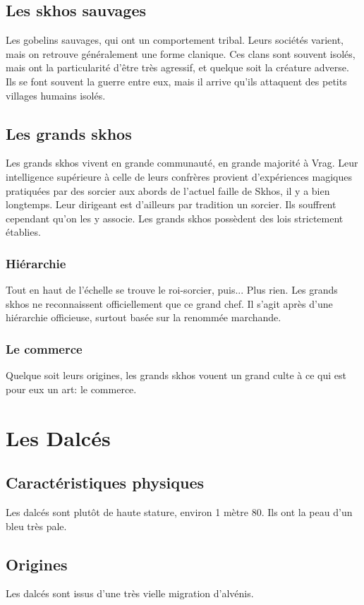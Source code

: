 \subsection{Les skhos sauvages}
Les gobelins sauvages, qui ont un comportement tribal. Leurs sociétés varient, mais on retrouve généralement une forme clanique. Ces clans sont souvent isolés, mais ont la particularité d'être très agressif, et quelque soit la créature adverse. Ils se font souvent la guerre entre eux, mais il arrive qu'ils attaquent des petits villages humains isolés.
\subsection{Les grands skhos}
Les grands skhos vivent en grande communauté, en grande majorité à Vrag. Leur intelligence supérieure à celle de leurs confrères provient d'expériences magiques pratiquées par des sorcier aux abords de l'actuel faille de Skhos, il y a bien longtemps. Leur dirigeant est d'ailleurs par tradition un sorcier.
Ils souffrent cependant qu’on les y associe. Les grands skhos possèdent des lois strictement établies.
\subsubsection{Hiérarchie}
Tout en haut de l'échelle se trouve le roi-sorcier, puis... Plus rien. Les grands skhos ne reconnaissent officiellement que ce grand chef. Il s'agit après d'une hiérarchie officieuse, surtout basée sur la renommée marchande.
\subsubsection{Le commerce}
Quelque soit leurs origines, les grands skhos vouent un grand culte à ce qui est pour eux un art: le commerce.

\section{Les Dalcés}
\subsection{Caractéristiques physiques}
Les dalcés sont plutôt de haute stature, environ 1 mètre 80. Ils ont la peau d'un bleu très pale.
\subsection{Origines}
Les dalcés sont issus d'une très vielle migration d'alvénis.

